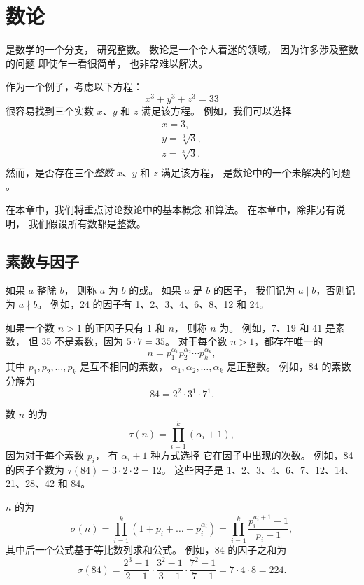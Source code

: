 \chapter{数论}


是数学的一个分支，
研究整数。
数论是一个令人着迷的领域，
因为许多涉及整数的问题
即使乍一看很简单，
也非常难以解决。

作为一个例子，考虑以下方程：
\[x^3 + y^3 + z^3 = 33\]
很容易找到三个实数 $x$、$y$ 和 $z$
满足该方程。
例如，我们可以选择
\[
\begin{array}{lcl}
x = 3, \\
y = \sqrt[3]{3}, \\
z = \sqrt[3]{3}.\\
\end{array}
\]
然而，是否存在三个\emph{整数} $x$、$y$ 和 $z$
满足该方程，
是数论中的一个未解决的问题 \cite{bec07}。

在本章中，我们将重点讨论数论中的基本概念
和算法。
在本章中，除非另有说明，
我们假设所有数都是整数。

\section{素数与因子}


如果 $a$ 整除 $b$，
则称 $a$ 为 $b$ 的或。
如果 $a$ 是 $b$ 的因子，
我们记为 $a \mid b$，否则记为 $a \nmid b$。
例如，24 的因子有
1、2、3、4、6、8、12 和 24。


如果一个数 $n>1$ 的正因子只有 1 和 $n$，
则称 $n$ 为。
例如，7、19 和 41 是素数，
但 35 不是素数，因为 $5 \cdot 7 = 35$。
对于每个数 $n>1$，都存在唯一的
\[ n = p_1^{\alpha_1} p_2^{\alpha_2} \cdots p_k^{\alpha_k},\]
其中 $p_1,p_2,\ldots,p_k$ 是互不相同的素数，
$\alpha_1,\alpha_2,\ldots,\alpha_k$ 是正整数。
例如，84 的素数分解为
\[84 = 2^2 \cdot 3^1 \cdot 7^1.\]

数 $n$ 的为
\[\tau(n)=\prod_{i=1}^k (\alpha_i+1),\]
因为对于每个素数 $p_i$，
有 $\alpha_i+1$ 种方式选择
它在因子中出现的次数。
例如，84 的因子个数为
$\tau(84)=3 \cdot 2 \cdot 2 = 12$。
这些因子是
1、2、3、4、6、7、12、14、21、28、42 和 84。

$n$ 的为
\[\sigma(n)=\prod_{i=1}^k (1+p_i+\ldots+p_i^{\alpha_i}) = \prod_{i=1}^k \frac{p_i^{a_i+1}-1}{p_i-1},\]
其中后一个公式基于等比数列求和公式。
例如，84 的因子之和为
\[\sigma(84)=\frac{2^3-1}{2-1} \cdot \frac{3^2-1}{3-1} \cdot \frac{7^2-1}{7-1} = 7 \cdot 4 \cdot 8 = 224.\]

